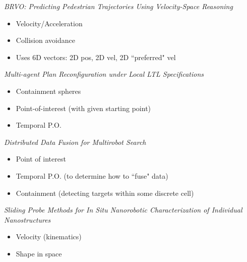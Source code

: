 \documentclass[12pt]{article}
\begin{document}
{\sl BRVO: Predicting Pedestrian Trajectories Using
Velocity-Space Reasoning}
\cite{kim2014brvo}
\begin{itemize}
  \item Velocity/Acceleration
  \item Collision avoidance
  \item Uses 6D vectors: 2D pos, 2D vel, 2D ``preferred" vel
\end{itemize}

{\sl Multi-agent Plan Reconfiguration under Local
LTL Specifications}
\cite{guo2014multi}
\begin{itemize}
  \item Containment spheres
  \item Point-of-interest (with given starting point)
  \item Temporal P.O.
\end{itemize}

{\sl Distributed Data Fusion for Multirobot Search}
\cite{hollingerdistributed}
\begin{itemize}
  \item Point of interest
  \item Temporal P.O. (to determine how to ``fuse" data)
  \item Containment (detecting targets within some 
                     discrete cell)
\end{itemize}

{\sl Sliding Probe Methods for \textit{In Situ} Nanorobotic
Characterization of Individual Nanostructures}
\cite{fansliding}
\begin{itemize}
  \item Velocity (kinematics)
  \item Shape in space
\end{itemize}



\end{document}
